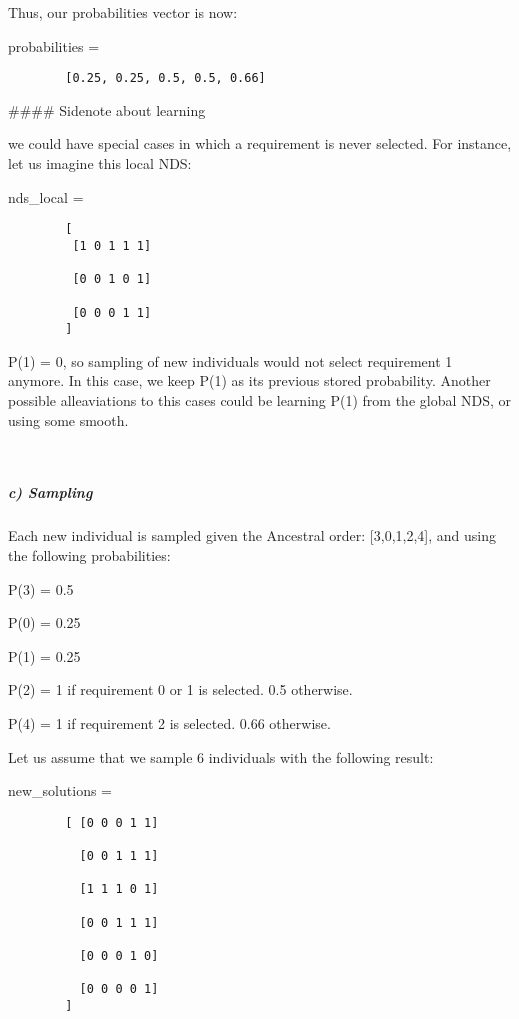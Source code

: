 \documentclass[11pt]{article}
\begin{document}
Thus, our probabilities vector is now:

probabilities =

\begin{verbatim}
        [0.25, 0.25, 0.5, 0.5, 0.66]
\end{verbatim}

\#\#\#\# Sidenote about learning

we could have special cases in which a requirement is never selected.
For instance, let us imagine this local NDS:

nds\_local =

\begin{verbatim}
        [
         [1 0 1 1 1]

         [0 0 1 0 1]

         [0 0 0 1 1]
        ]
\end{verbatim}

P(1) = 0, so sampling of new individuals would not select requirement 1
anymore. In this case, we keep P(1) as its previous stored probability.
Another possible alleaviations to this cases could be learning P(1) from
the global NDS, or using some smooth.

    \begin{center}
    \end{center}
    { \hspace*{\fill} \\}
    
    \subparagraph{c) Sampling}\label{c-sampling}

Each new individual is sampled given the Ancestral order:
{[}3,0,1,2,4{]}, and using the following probabilities:

P(3) = 0.5

P(0) = 0.25

P(1) = 0.25

P(2) = 1 if requirement 0 or 1 is selected. 0.5 otherwise.

P(4) = 1 if requirement 2 is selected. 0.66 otherwise.

Let us assume that we sample 6 individuals with the following result:

new\_solutions =

\begin{verbatim}
        [ [0 0 0 1 1]

          [0 0 1 1 1]

          [1 1 1 0 1]

          [0 0 1 1 1]

          [0 0 0 1 0]
          
          [0 0 0 0 1]
        ]
\end{verbatim}
\end{document}
